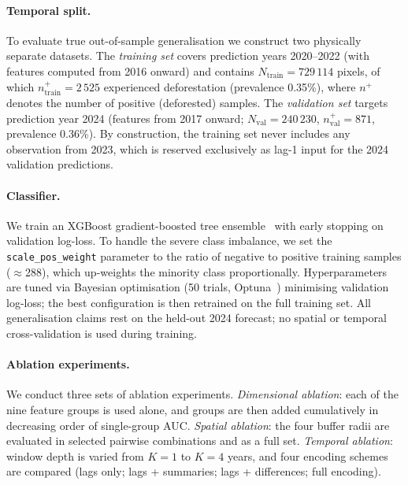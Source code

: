 \documentclass{iopart}
\begin{document}
\paragraph{Temporal split.}
To evaluate true out-of-sample generalisation we construct two
physically separate datasets.
The \emph{training set} covers prediction years 2020--2022
(with features computed from 2016 onward) and contains
$N_\mathrm{train}=729\,114$ pixels, of which
$n^+_\mathrm{train}=2\,525$ experienced deforestation
(prevalence 0.35\%), where $n^+$ denotes the number of
positive (deforested) samples.
The \emph{validation set} targets prediction year 2024
(features from 2017 onward; $N_\mathrm{val}=240\,230$,
$n^+_\mathrm{val}=871$, prevalence 0.36\%).
By construction, the training set never includes any observation
from 2023, which is reserved exclusively as lag-1 input
for the 2024 validation predictions.

\paragraph{Classifier.}
We train an XGBoost gradient-boosted tree
ensemble~\cite{Chen2016} with early stopping on validation
log-loss.
To handle the severe class imbalance, we set the
\texttt{scale\_pos\_weight} parameter to the ratio of negative
to positive training samples ($\approx$288), which up-weights
the minority class proportionally.
Hyperparameters are tuned via Bayesian optimisation
(50 trials, Optuna~\cite{Akiba2019}) minimising validation
log-loss; the best configuration is then retrained on the full
training set.
All generalisation claims rest on the held-out 2024 forecast;
no spatial or temporal cross-validation is used during training.

\paragraph{Ablation experiments.}
We conduct three sets of ablation experiments.
\emph{Dimensional ablation}: each of the nine feature groups is used alone,
and groups are then added cumulatively in decreasing order of
single-group AUC.
\emph{Spatial ablation}: the four buffer radii are evaluated in selected
pairwise combinations and as a full set.
\emph{Temporal ablation}: window depth is varied from $K=1$ to $K=4$ years,
and four encoding schemes are compared (lags only; lags + summaries;
lags + differences; full encoding).
\end{document}
